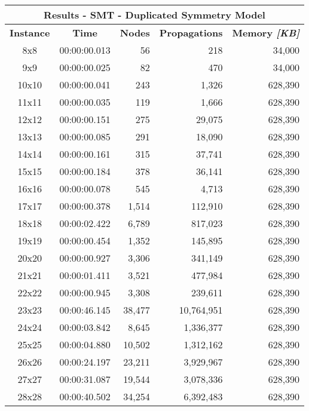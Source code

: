 
\begin{center}
    \begin{tabular}{|c|c|r|r|r|}
        \hline
        \multicolumn{5}{|c|}{\textbf{Results - SMT - Duplicated Symmetry Model}} \\
        \hline
        \textbf{Instance} & \textbf{Time} & \textbf{Nodes} & \textbf{Propagations} & \textbf{Memory \textit{[KB]}} \\
        
        \hline
		8x8 & 00:00:00.013 & 56 & 218 & 34,000 \\ \hline
		9x9 & 00:00:00.025 & 82 & 470 & 34,000 \\ \hline
		10x10 & 00:00:00.041 & 243 & 1,326 & 628,390 \\ \hline
		11x11 & 00:00:00.035 & 119 & 1,666 & 628,390 \\ \hline
		12x12 & 00:00:00.151 & 275 & 29,075 & 628,390 \\ \hline
		13x13 & 00:00:00.085 & 291 & 18,090 & 628,390 \\ \hline
		14x14 & 00:00:00.161 & 315 & 37,741 & 628,390 \\ \hline
		15x15 & 00:00:00.184 & 378 & 36,141 & 628,390 \\ \hline
		16x16 & 00:00:00.078 & 545 & 4,713 & 628,390 \\ \hline
		17x17 & 00:00:00.378 & 1,514 & 112,910 & 628,390 \\ \hline
		18x18 & 00:00:02.422 & 6,789 & 817,023 & 628,390 \\ \hline
		19x19 & 00:00:00.454 & 1,352 & 145,895 & 628,390 \\ \hline
		20x20 & 00:00:00.927 & 3,306 & 341,149 & 628,390 \\ \hline
		21x21 & 00:00:01.411 & 3,521 & 477,984 & 628,390 \\ \hline
		22x22 & 00:00:00.945 & 3,308 & 239,611 & 628,390 \\ \hline
		23x23 & 00:00:46.145 & 38,477 & 10,764,951 & 628,390 \\ \hline
		24x24 & 00:00:03.842 & 8,645 & 1,336,377 & 628,390 \\ \hline
		25x25 & 00:00:04.880 & 10,502 & 1,312,162 & 628,390 \\ \hline
		26x26 & 00:00:24.197 & 23,211 & 3,929,967 & 628,390 \\ \hline
		27x27 & 00:00:31.087 & 19,544 & 3,078,336 & 628,390 \\ \hline
		28x28 & 00:00:40.502 & 34,254 & 6,392,483 & 628,390 \\ \hline

\end{tabular}
\end{center}
